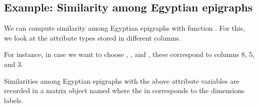 \documentclass[a4paper,12pt,english]{sphinxhowto}
\begin{document}
\subsection{Example: Similarity among Egyptian epigraphs}
\label{\detokenize{EpigraphicNetwork:example-similarity-among-egyptian-epigraphs}}
We can compute similarity among Egyptian epigraphs with function .
For this, we look at the attribute types stored in different columns.

\begin{sphinxVerbatim}[commandchars=\\\{\},formatcom=\footnotesize]
 
\end{sphinxVerbatim}


For instance, in case we want to choose , , and ,
these correspond to columns 8, 5, and 3.

Similarities among Egyptian epigraphs  with the above attribute variables are recorded in
a matrix object named  where the  in  corresponds to the dimensions labels.

\begin{sphinxVerbatim}[commandchars=\\\{\},formatcom=\footnotesize]
     

 
\end{sphinxVerbatim}
\end{document}
